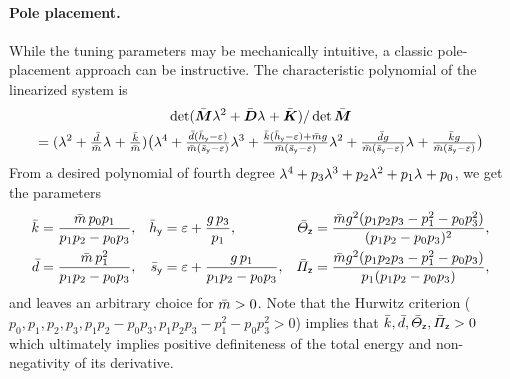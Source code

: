 \paragraph{Pole placement.}
While the tuning parameters may be mechanically intuitive, a classic pole-placement approach can be instructive.
The characteristic polynomial of the linearized system is
\begin{multline}
 \det(\bar{\boldsymbol{M}} \lambda_{}^2 + \bar{\boldsymbol{D}} \lambda_{} + \bar{\boldsymbol{K}}) / \det\bar{\boldsymbol{M}}
\\
 = (\lambda_{}^2 + \tfrac{\bar{d}}{\bar{m}} \lambda_{} + \tfrac{\bar{k}}{\bar{m}})
 \big(\lambda_{}^4
 + \tfrac{\bar{d}(\bar{h}_{\mathsf{y}}-\varepsilon)}{\bar{m}(\bar{s}_{\mathsf{y}}-\varepsilon)} \lambda_{}^3
 + \tfrac{\bar{k}(\bar{h}_{\mathsf{y}}-\varepsilon) + \bar{m} g}{\bar{m}(\bar{s}_{\mathsf{y}}-\varepsilon)} \lambda_{}^2
 + \tfrac{\bar{d} g}{\bar{m} (\bar{s}_{\mathsf{y}}-\varepsilon)} \lambda_{}
 + \tfrac{\bar{k} g}{\bar{m} (\bar{s}_{\mathsf{y}}-\varepsilon)} \big)
\end{multline}
From a desired polynomial of fourth degree $\lambda_{}^4 + p_3 \lambda_{}^3 + p_2 \lambda_{}^2 + p_1 \lambda_{} + p_0$, we get the parameters
\begin{align}
 \bar{k} &= \frac{\bar{m} \, p_0 p_1}{p_1 p_2 - p_0 p_3},&
 \bar{h}_{\mathsf{y}} &= \varepsilon + \frac{g\, p_3}{p_1},&
 \bar{\varTheta}_{\mathsf{z}} &= \frac{\bar{m} g^2 (p_1 p_2 p_3 - p_1^2 - p_0 p_3^2)}{(p_1 p_2 - p_0 p_3)^2},
\\
 \bar{d} &= \frac{\bar{m}\, p_1^2}{p_1 p_2 - p_0 p_3},&
 \bar{s}_{\mathsf{y}} &= \varepsilon + \frac{g\, p_1}{p_1 p_2 - p_0 p_3},&
 \bar{\varPi}_{\mathsf{z}} &= \frac{\bar{m} g^2 (p_1 p_2 p_3 - p_1^2 - p_0 p_3)}{p_1 (p_1 p_2 - p_0 p_3)}, 
\end{align}
and leaves an arbitrary choice for $\bar{m} > 0$.
Note that the Hurwitz criterion ($p_0, p_1, p_2, p_3, p_1 p_2 - p_0 p_3, p_1 p_2 p_3 - p_1^2 - p_0 p_3^2 > 0$) implies that $\bar{k}, \bar{d}, \bar{\varTheta}_{\mathsf{z}}, \bar{\varPi}_{\mathsf{z}} > 0$ which ultimately implies positive definiteness of the total energy and non-negativity of its derivative.

